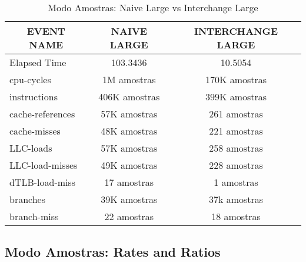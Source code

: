 \documentclass[11pt, oneside]{article}   	%
\begin{document}
\begin{table}[h!]
\centering
\label{table:modo_amostras}
\begin{tabular}{|l|c|c|}
\hline
\multicolumn{1}{|c|}{\textbf{EVENT NAME}} & \textbf{NAIVE LARGE} & \textbf{INTERCHANGE LARGE} \\ \hline
Elapsed Time                              & 103.3436             & 10.5054                    \\ \hline
cpu-cycles                                & 1M amostras          & 170K amostras              \\ \hline
instructions                              & 406K amostras        & 399K amostras              \\ \hline
cache-references                          & 57K amostras         & 261 amostras               \\ \hline
cache-misses                              & 48K amostras         & 221 amostras               \\ \hline
LLC-loads                                 & 57K amostras         & 258 amostras               \\ \hline
LLC-load-misses                           & 49K amostras         & 228 amostras               \\ \hline
dTLB-load-miss                            & 17 amostras          & 1 amostras                 \\ \hline
branches                                  & 39K amostras         & 37k amostras               \\ \hline
branch-miss                               & 22 amostras          & 18 amostras                \\ \hline
\end{tabular}
\caption{Modo Amostras: Naive Large vs Interchange Large}
\end{table}

\subsection{Modo Amostras: Rates and Ratios}
\end{document}
